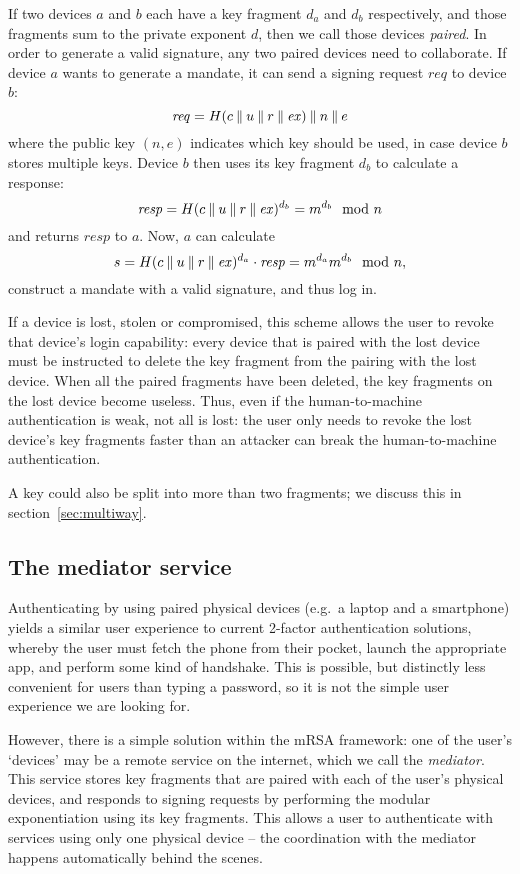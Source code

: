 If two devices $a$ and $b$ each have a key fragment $d_a$ and $d_b$ respectively, and those
fragments sum to the private exponent $d$, then we call those devices \emph{paired}. In order to
generate a valid signature, any two paired devices need to collaborate. If device $a$ wants to
generate a mandate, it can send a signing request $\mathit{req}$ to device $b$:
$$\mathit{req} = H(c \mathbin{\|} u \mathbin{\|} r \mathbin{\|} \mathit{ex}) \mathbin{\|} n \mathbin{\|} e$$
where the public key $(n, e)$ indicates which key should be used, in case device $b$ stores multiple
keys. Device $b$ then uses its key fragment $d_b$ to calculate a response:
$$\mathit{resp} = H(c \mathbin{\|} u \mathbin{\|} r \mathbin{\|} \mathit{ex})^{d_b} = m^{d_b} \mod n$$
and returns $\mathit{resp}$ to $a$. Now, $a$ can calculate
$$s = H(c \mathbin{\|} u \mathbin{\|} r \mathbin{\|} \mathit{ex})^{d_a} \cdot \mathit{resp} = m^{d_a} m^{d_b} \mod n,$$
construct a mandate with a valid signature, and thus log in.

If a device is lost, stolen or compromised, this scheme allows the user to revoke that device's
login capability: every device that is paired with the lost device must be instructed to delete the
key fragment from the pairing with the lost device. When all the paired fragments have been deleted,
the key fragments on the lost device become useless. Thus, even if the human-to-machine
authentication is weak, not all is lost: the user only needs to revoke the lost device's key
fragments faster than an attacker can break the human-to-machine authentication.

A key could also be split into more than two fragments; we discuss this in section~\ref{sec:multiway}.

\subsection{The mediator service}\label{sec:mediator}

Authenticating by using paired physical devices (e.g.\ a laptop and a smartphone) yields a similar
user experience to current 2-factor authentication solutions, whereby the user must fetch the phone
from their pocket, launch the appropriate app, and perform some kind of handshake. This is
possible, but distinctly less convenient for users than typing a password, so it is not the simple
user experience we are looking for.

However, there is a simple solution within the mRSA framework: one of the user's `devices' may be a
remote service on the internet, which we call the \emph{mediator}. This service stores key fragments
that are paired with each of the user's physical devices, and responds to signing requests by
performing the modular exponentiation using its key fragments. This allows a user to authenticate
with services using only one physical device -- the coordination with the mediator happens
automatically behind the scenes.

